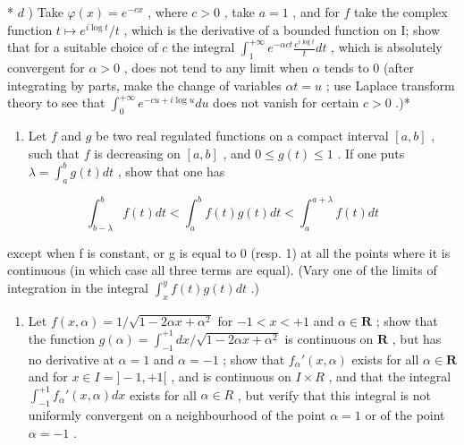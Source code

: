 * \(d\) ) Take \(\varphi (x) = e^{-cx}\) , where \(c > 0\) , take \(a = 1\) , and for \(f\) take the complex function \(t\mapsto e^{i\log t} / t\) , which is the derivative of a bounded function on I; show that for a suitable choice of \(c\) the integral \(\int_{1}^{+\infty}e^{-\alpha ct}\frac{e^{i\log t}}{t} dt\) , which is absolutely convergent for \(\alpha >0\) , does not tend to any limit when \(\alpha\) tends to 0 (after integrating by parts, make the change of variables \(\alpha t = u\) ; use Laplace transform theory to see that \(\int_0^{+\infty}e^{-cu + i\log u}du\) does not vanish for certain \(c > 0\) .)*

\begin{enumerate}
\def\labelenumi{\arabic{enumi})}
\setcounter{enumi}{1}
\tightlist
\item
  Let \(f\) and \(g\) be two real regulated functions on a compact interval \([a, b]\) , such that \(f\) is decreasing on \([a, b]\) , and \(0 \leqslant g(t) \leqslant 1\) . If one puts \(\lambda = \int_{a}^{b} g(t) dt\) , show that one has
\end{enumerate}

\[
\int_ {b - \lambda} ^ {b} f (t) d t <   \int_ {a} ^ {b} f (t) g (t) d t <   \int_ {a} ^ {a + \lambda} f (t) d t
\]

except when f is constant, or g is equal to 0 (resp. 1) at all the points where it is continuous (in which case all three terms are equal). (Vary one of the limits of integration in the integral \(\int_{x}^{y} f(t)g(t)dt\) .)

\begin{enumerate}
\def\labelenumi{\arabic{enumi})}
\setcounter{enumi}{2}
\tightlist
\item
  Let \(f(x, \alpha) = 1 / \sqrt{1 - 2\alpha x + \alpha^2}\) for \(-1 < x < +1\) and \(\alpha \in \mathbf{R}\) ; show that the function \(g(\alpha) = \int_{-1}^{+1} dx / \sqrt{1 - 2\alpha x + \alpha^2}\) is continuous on \(\mathbf{R}\) , but has no derivative at \(\alpha = 1\) and \(\alpha = -1\) ; show that \(f_{\alpha}'(x, \alpha)\) exists for all \(\alpha \in \mathbf{R}\) and for \(x \in I = ] - 1, +1[\) , and is continuous on \(I \times R\) , and that the integral \(\int_{-1}^{+1} f_{\alpha}'(x, \alpha) dx\) exists for all \(\alpha \in R\) , but verify that this integral is not uniformly convergent on a neighbourhood of the point \(\alpha = 1\) or of the point \(\alpha = -1\) .
\end{enumerate}

